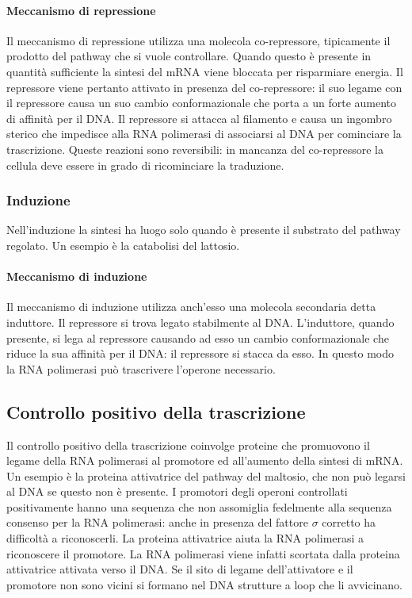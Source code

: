 			\paragraph{Meccanismo di repressione}
			Il meccanismo di repressione utilizza una molecola co-repressore, tipicamente il prodotto del pathway che si vuole controllare.
			Quando questo \`e presente in quantit\`a sufficiente la sintesi del mRNA viene bloccata per risparmiare energia.
			Il repressore viene pertanto attivato in presenza del co-repressore: il suo legame con il repressore causa un suo cambio conformazionale che porta a un forte aumento di affinit\`a per il DNA.
			Il repressore si attacca al filamento e causa un ingombro sterico che impedisce alla RNA polimerasi di associarsi al DNA per cominciare la trascrizione.
			Queste reazioni sono reversibili: in mancanza del co-repressore la cellula deve essere in grado di ricominciare la traduzione.

		\subsubsection{Induzione}
		Nell'induzione la sintesi ha luogo solo quando \`e presente il substrato del pathway regolato.
		Un esempio \`e la catabolisi del lattosio.

			\paragraph{Meccanismo di induzione}
			Il meccanismo di induzione utilizza anch'esso una molecola secondaria detta induttore.
			Il repressore si trova legato stabilmente al DNA.
			L'induttore, quando presente, si lega al repressore causando ad esso un cambio conformazionale che riduce la sua affinit\`a per il DNA: il repressore si stacca da esso.
			In questo modo la RNA polimerasi pu\`o trascrivere l'operone necessario.

	\subsection{Controllo positivo della trascrizione}
	Il controllo positivo della trascrizione coinvolge proteine che promuovono il legame della RNA polimerasi al promotore ed all'aumento della sintesi di mRNA. 
	Un esempio \`e la proteina attivatrice del pathway del maltosio, che non pu\`o legarsi al DNA se questo non \`e presente.
	I promotori degli operoni controllati positivamente hanno una sequenza che non assomiglia fedelmente alla sequenza consenso per la RNA polimerasi: anche in presenza del fattore $\sigma$ corretto ha difficoltà a riconoscerli. 
	La proteina attivatrice aiuta la RNA polimerasi a riconoscere il promotore. 
	La RNA polimerasi viene infatti scortata dalla proteina attivatrice attivata verso il DNA.
	Se il sito di legame dell'attivatore e il promotore non sono vicini si formano nel DNA strutture a loop che li avvicinano.

